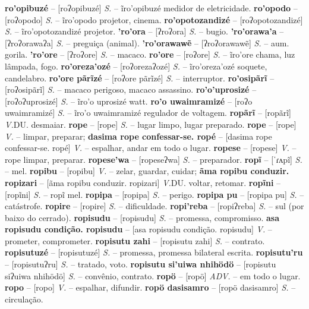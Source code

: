 \textbf{ro'opibuzé} -- [roʔopibuzé] \textit{S.} -- ĩro'opibuzé medidor de eletricidade.
\textbf{ro'opodo} -- [roʔopodo] \textit{S.} -- ĩro'opodo projetor, cinema.
\textbf{ro'opotozandizé} -- [roʔopotozandizé] \textit{S.} -- ĩro'opotozandizé projetor.
\textbf{'ro'ora} -- [ʔroʔora] \textit{S.} -- bugio.
\textbf{'ro'orawa'a} -- [ʔroʔorawaʔa] \textit{S.} -- preguiça (animal).
\textbf{'ro'orawawẽ} -- [ʔroʔorawawẽ] \textit{S.} -- aum. gorila.
\textbf{'ro'ore} -- [ʔroʔore] \textit{S.} -- macaco.
\textbf{ro'ore} -- [roʔore] \textit{S.} -- ĩro'ore chama, luz lâmpada, fogo.
\textbf{ro'oreza'ozé} -- [roʔorezaʔozé] \textit{S.} -- ĩro'oreza'ozé soquete, candelabro.
\textbf{ro'ore pãrĩzé} -- [roʔore pãrĩzé] \textit{S.} -- interruptor.
\textbf{ro'osipãrĩ} -- [roʔosipãrĩ] \textit{S.} -- macaco perigoso, macaco assassino.
\textbf{ro'o'uprosizé} -- [roʔoʔuprosizé] \textit{S.} -- ĩro'o uprosizé watt.
\textbf{ro'o uwaimramizé} -- [roʔo uwaimramizé] \textit{S.} -- ĩro'o uwaimramizé regulador de voltagem.
\textbf{ropãrĩ} -- [ropãrĩ] \textit{V.}DU. desmaiar.
\textbf{rope} -- [rope] \textit{S.} -- lugar limpo, lugar preparado.
\textbf{rope} -- [rope] \textit{V.} -- limpar, preparar;
\textbf{dasima rope confessar-se. ropé} -- [dasima rope confessar-se. ropé] \textit{V.} -- espalhar, andar em todo o lugar.
\textbf{ropese} -- [ropese] \textit{V.} -- rope limpar, preparar.
\textbf{ropese'wa} -- [ropeseʔwa] \textit{S.} -- preparador.
\textbf{ropĩ} -- [ˈɾʌpĩ] \textit{S.} -- mel.
\textbf{ropibu} -- [ropibu] \textit{V.} -- zelar, guardar, cuidar;
\textbf{ãma ropibu conduzir. ropizari} -- [ãma ropibu conduzir. ropizari] \textit{V.}DU. voltar, retomar.
\textbf{ropĩni} -- [ropĩni] \textit{S.} -- ropĩ mel.
\textbf{ropipa} -- [ropipa] \textit{S.} -- perigo.
\textbf{ropipa pu} -- [ropipa pu] \textit{S.} -- catástrofe.
\textbf{ropire} -- [ropire] \textit{S.} -- dificuldade.
\textbf{ropi'reba} -- [ropiʔreba] \textit{S.} -- sul (por baixo do cerrado).
\textbf{ropisudu} -- [ropisudu] \textit{S.} -- promessa, compromisso.
\textbf{asa ropisudu condição. ropisudu} -- [asa ropisudu condição. ropisudu] \textit{V.} -- prometer, comprometer.
\textbf{ropisutu zahi} -- [ropisutu zahi] \textit{S.} -- contrato.
\textbf{ropisutuzé} -- [ropisutuzé] \textit{S.} -- promessa, promessa bilateral escrita.
\textbf{ropisutu'ru} -- [ropisutuʔru] \textit{S.} -- tratado, voto.
\textbf{ropisutu si'uiwa nhihödö} -- [ropisutu siʔuiwa nhihödö] \textit{S.} -- convênio, contrato.
\textbf{ropö} -- [ropö] \textit{ADV.} -- em todo o lugar.
\textbf{ropo} -- [ropo] \textit{V.} -- espalhar, difundir.
\textbf{ropö dasisamro} -- [ropö dasisamro] \textit{S.} -- circulação.

